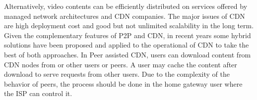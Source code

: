 \documentclass[10pt,final,journal,a4paper]{IEEEtran}
\begin{document}

Alternatively, video contents can be efficiently distributed on services offered by managed network architectures and CDN companies.
The major issues of CDN are high deployment cost and good but not unlimited scalability in the long term.  
Given the complementary features of P2P and CDN, in recent years some hybrid solutions have been proposed and applied to the operational of CDN \cite{Huang:2008:UHC:1496046.1496064,4772628,Yin:2009:DDH:1631272.1631279} to take the best of both approaches.
In Peer assisted CDN, users can download content from CDN nodes from or other users or peers. 
A user may cache the content after download to serve requests from other users. 
Due to the complexity of the behavior of peers, the process should be done in the home gateway user where the ISP can control it.
\end{document}
